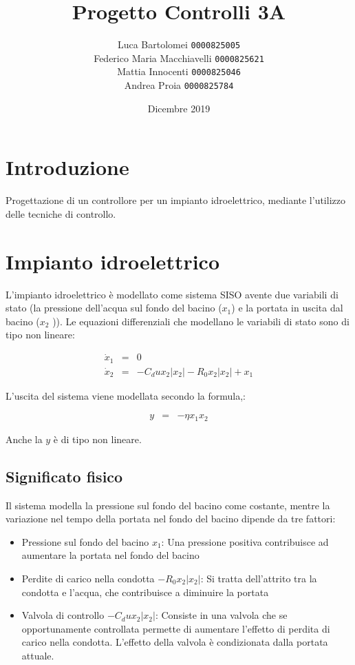 \documentclass{article}
\title{Progetto Controlli 3A}
\author{
    Luca Bartolomei 
    \texttt{0000825005}
    \\
    Federico Maria Macchiavelli 
    \texttt{0000825621}
    \\
    Mattia Innocenti 
    \texttt{0000825046}
    \\
    Andrea Proia 
    \texttt{0000825784}
}
\date{Dicembre 2019}
\begin{document}
\maketitle

\section{Introduzione}

Progettazione di un controllore per un impianto idroelettrico, mediante l'utilizzo delle tecniche di controllo.

\section{Impianto idroelettrico}

L'impianto idroelettrico è modellato come sistema SISO avente due variabili di stato (la pressione  dell’acqua sul fondo del bacino ($x_1$) e la portata in uscita dal bacino ($x_2$ )). Le equazioni differenziali che modellano le variabili di stato sono di tipo non lineare:

$$
\begin{array}{lcl}
    \dot{x}_1 & = & 0 \\
    \dot{x}_2 & = & -C_d u x_2 |x_2| -R_0 x_2 |x_2| + x_1
\end{array}
$$

L'uscita del sistema viene modellata secondo la formula,:

$$
\begin{array}{lcl}
    y & = & -\eta x_1 x_2
\end{array}
$$

Anche la $y$ è di tipo non lineare.

\subsection{Significato fisico}

Il sistema modella la pressione sul fondo del bacino come costante, mentre la variazione nel tempo della portata nel fondo del bacino dipende da tre fattori:

\begin{itemize}
    \item Pressione sul fondo del bacino $x_1$: Una pressione positiva contribuisce ad aumentare la portata nel fondo del bacino
    \item Perdite di carico nella condotta $-R_0 x_2 |x_2|$: Si tratta dell'attrito tra la condotta e l'acqua, che contribuisce a diminuire la portata
    \item Valvola di controllo $-C_d u x_2 |x_2|$: Consiste in una valvola che se opportunamente controllata permette di aumentare l'effetto di perdita di carico nella condotta. L'effetto della valvola è condizionata dalla portata attuale.
\end{itemize}
\end{document}
